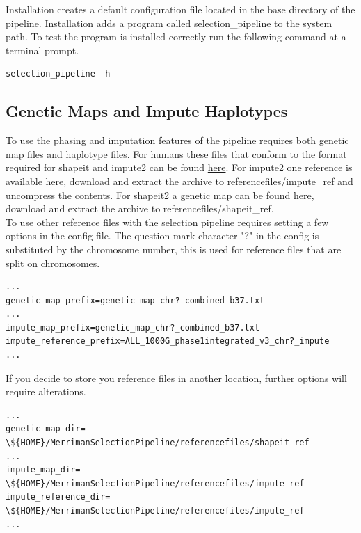 \documentclass[a4paper,10pt]{article}
\begin{document}
Installation creates a default configuration file located in the base directory of the pipeline. Installation adds a program called selection\_pipeline to the system path. To test the program is installed correctly run the following command at a terminal prompt.

\begin{verbatim}
selection_pipeline -h
\end{verbatim}

\subsection{Genetic Maps and Impute Haplotypes}
To use the phasing and imputation features of the pipeline requires both genetic map files and haplotype files. For humans these files that conform to the format required for shapeit and impute2 can be found \href{http://mathgen.stats.ox.ac.uk/impute/impute_v2.html#reference}{here}. For impute2 one reference is available \href{http://mathgen.stats.ox.ac.uk/impute/ALL_1000G_phase1integrated_v3_impute_macGT1.tgz}{here}, download and extract the archive to referencefiles/impute\_ref and uncompress the contents. For shapeit2 a genetic map can be found \href{http://www.shapeit.fr/files/genetic_map_b37.tar.gz}{here}, download and extract the archive to referencefiles/shapeit\_ref.\\

To use other reference files with the selection pipeline requires setting a few options in the config file. The question mark character "?" in the config is substituted by the chromosome number, this is used for reference files that are split on chromosomes.\\
\begin{verbatim}
...
genetic_map_prefix=genetic_map_chr?_combined_b37.txt
...
impute_map_prefix=genetic_map_chr?_combined_b37.txt
impute_reference_prefix=ALL_1000G_phase1integrated_v3_chr?_impute
...
\end{verbatim}

If you decide to store you reference files in another location, further options will require alterations.\\ 
\begin{verbatim}
...
genetic_map_dir= \${HOME}/MerrimanSelectionPipeline/referencefiles/shapeit_ref
...
impute_map_dir= \${HOME}/MerrimanSelectionPipeline/referencefiles/impute_ref
impute_reference_dir= \${HOME}/MerrimanSelectionPipeline/referencefiles/impute_ref
...
\end{verbatim}
\end{document}
